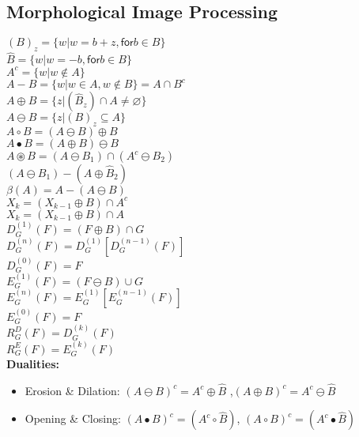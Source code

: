 \documentclass{../cheat}
\begin{document}
\begin{multicols}{3}
	\section{Morphological Image Processing}
	\setlength{\gapspace}{0.4\columnwidth}
	 $(B)_z=\{ w | w=b+z, \mathsf{for} b \in B\}$\\
	 $\hat{B}=\{ w | w=-b, \mathsf{for} b \in B\}$\\
	 $A^c=\{ w | w \notin A\}$\\
	 $A-B=\{ w | w \in A, w \notin B\}=A \cap B^c$\\
	 $A \oplus B=\{z|(\hat{B}_z) \cap A \neq \varnothing \}$\\
	 $A \ominus B=\{z|(B)_z \subseteq A\}$\\
	 $A \circ B = (A \ominus B) \oplus B$\\
	 $A \bullet B = (A \oplus B) \ominus B$\\
	 $A \circledast B = (A \ominus B_1) \cap (A^c \ominus B_2)$\\
	\tab{ } $(A \ominus B_1) - (A \oplus \hat{B}_2)$\\
	 $\beta(A) = A - (A \ominus B)$\\
	 $X_k = (X_{k-1} \oplus B) \cap A^c$\\
	 $X_k = (X_{k-1} \oplus B) \cap A$\\
	 $D_G^{(1)}(F) = (F \oplus B) \cap G$ \\
	\tab{} $D_G^{(n)}(F) = D_G^{(1)}[D_G^{(n-1)}(F)]$\\
	\tab{} $D_G^{(0)}(F)=F$\\
	 $E_G^{(1)}(F) = (F \ominus B) \cup G$\\
	\tab{} $E_G^{(n)}(F) = E_G^{(1)}[E_G^{(n-1)}(F)]$\\
	\tab{} $E_G^{(0)}(F)=F$\\
	 $R_G^D(F) = D_G^{(k)}(F)$\\
	 $R_G^E(F) = E_G^{(k)}(F)$\\

	\textbf{Dualities:}
	\begin{itemize}
		\item Erosion \& Dilation: $(A \ominus B)^c = A^c \oplus \hat{B}$ ,$(A \oplus B)^c = A^c \ominus \hat{B}$
		\item Opening \& Closing: $(A \bullet B)^c = (A^c \circ \hat{B})$, $(A \circ B)^c = (A^c \bullet \hat{B})$
	\end{itemize}
	

\end{multicols}
\end{document}
